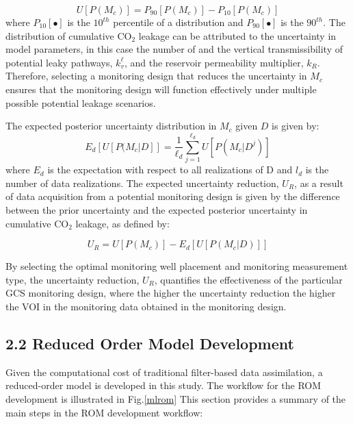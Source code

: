 \documentclass[10pt, twoside]{article}
\begin{document}
\begin{equation} \label{eq:1}
    U[P(M_c)] = P_{90}[P(M_c)] - P_{10}[P(M_c)]
\end{equation}
where $P_{10}[\bullet]$ is the $10^{th}$ percentile of a distribution and $P_{90}[\bullet]$ is the $90^{th}$. The distribution of cumulative CO$_2$ leakage can be attributed to the uncertainty in model parameters, in this case the number of and the vertical transmissibility of potential leaky pathways, $k_v^\ell$, and the reservoir permeability multiplier, $k_R$. Therefore, selecting a monitoring design that reduces the uncertainty in $M_c$ ensures that the monitoring design will function effectively under multiple possible potential leakage scenarios.

The expected posterior uncertainty distribution in $M_c$ given $D$ is given by:
\begin{equation} \label{eq:2}
    E_d [U [ P(M_c \vert D]] = \frac{1}{\ell_d} \sum_{j=1}^{\ell_d} U [P (M_c \vert D^j) ]
\end{equation}
where $E_d$ is the expectation with respect to all realizations of D and $l_d$ is the number of data realizations. The expected uncertainty reduction, $U_R$, as a result of data acquisition from a potential monitoring design is given by the difference between the prior uncertainty and the expected posterior uncertainty in cumulative CO$_2$ leakage, as defined by:

\begin{equation} \label{eq:3}
    U_R = U[P(M_c)] - E_d [U [ P(M_c \vert D)]]
\end{equation}

By selecting the optimal monitoring well placement and monitoring measurement type, the uncertainty reduction, $U_R$, quantifies the effectiveness of the particular GCS monitoring design, where the higher the uncertainty reduction the higher the VOI in the monitoring data obtained in the monitoring design.


\subsection*{2.2 Reduced Order Model Development}
Given the computational cost of traditional filter-based data assimilation, a reduced-order model is developed in this study. The workflow for the ROM development is illustrated in Fig.\ref{mlrom} This section provides a summary of the main steps in the ROM development workflow:
\end{document}
